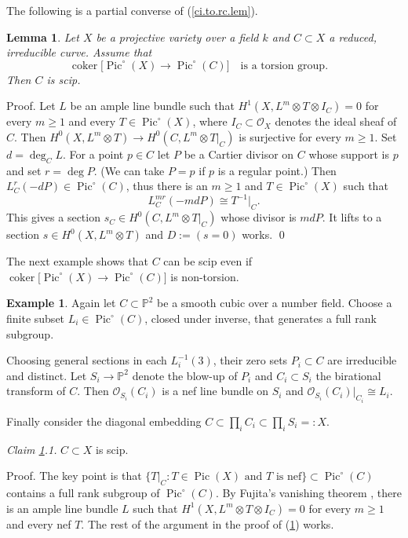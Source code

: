\documentclass{amsart}
\newtheorem{lem}[thm]{Lemma}
\theoremstyle{definition}
\newtheorem{exmp}[thm]{Example}
\theoremstyle{remark}
\renewcommand{\o}[0]{{\mathcal O}}
\newcommand{\p}[0]{{\mathbb P}}
\newcommand{\qtq}[1]{\quad\mbox{#1}\quad}
\newcommand{\pic}[0]{\operatorname{Pic}}
\newcommand{\coker}[0]{\operatorname{coker}}
\begin{document}
The following  is a partial converse of (\ref{ci.to.rc.lem}).


\begin{lem} \label{rc.to.ci.lem}
Let $X$ be a projective variety over a field $k$ and $C\subset X$ a reduced, irreducible  curve.
Assume that $$\coker\bigl[\pic^\circ(X)\to \pic^\circ(C)\bigr]\qtq{is a torsion group.}$$ Then $C$ is scip.
\end{lem}

Proof. Let $L$ be an ample line bundle such that $H^1(X, L^m\otimes T\otimes I_C)=0$ for every $m\geq 1$ and every $T\in \pic^\circ(X)$, where $I_C\subset \o_X$ denotes the ideal sheaf of $C$. 
Then $H^0(X, L^m\otimes T)\to H^0(C, L^m\otimes T|_C)$ is surjective for every $m\geq 1$. Set $d=\deg_CL$. For a  point  $p\in C$ let $P$ be a Cartier divisor on $C$ whose support is $p$ and set $r=\deg P$. (We can take $P=p$ if $p$ is a regular point.) 
Then   $L^r_C(-dP)\in \pic^\circ(C)$, thus
there is an  $m\geq 1$ and $T\in \pic^\circ(X)$ such that
$$
L^{mr}_C(-md P)\cong T^{-1}|_C.
$$
 This gives a section  $s_C\in H^0(C, L^m\otimes T|_C)$ whose divisor is $mdP$. It lifts to a section $s\in H^0(X, L^m\otimes T)$ and $D:=(s=0)$ works. \qed
\medskip


The next example shows that $C$ can be scip even if
$\coker\bigl[\pic^\circ(X)\to \pic^\circ(C)\bigr]$ is non-torsion.


\begin{exmp}\label{rc.to.ci.lem.2g.exmp}
Again let $C\subset \p^2$ be a smooth cubic over a number field.
 Choose a finite subset $L_i\in \pic^\circ(C)$, closed  under inverse,  that generates a full rank subgroup.



Choosing general sections in each  $L_i^{-1}(3)$, their zero sets $P_i\subset C$
are irreducible and distinct. Let
$S_i\to \p^2$ denote the blow-up of $P_i$ and  $C_i\subset S_i$  the birational transform of $C$. Then $\o_{S_i}(C_i)$ is a nef line bundle on $S_i$ 
and $ \o_{S_i}(C_i)|_{C_i}\cong L_i$. 

Finally consider the diagonal embedding   $C\subset \prod_i C_i\subset \prod_i S_i=:X$.
\medskip

{\it Claim \ref{rc.to.ci.lem.2g.exmp}.1.}   $C\subset X$ is scip.
\medskip

Proof. The key point is that
$\{ T|_C:  T\in \pic(X) \mbox{ and $T$ is nef}\}\subset \pic^\circ(C)$
contains a full  rank subgroup of $\pic^\circ(C)$. 
By Fujita's vanishing theorem  \cite[1.4.35]{laz-book},
there is  an ample line bundle $L$ such that $H^1(X, L^m\otimes T\otimes I_C)=0$ for every $m\geq 1$ and every nef $T$. The rest of the
argument in the proof of (\ref{rc.to.ci.lem}) works.
\end{exmp}
\end{document}
